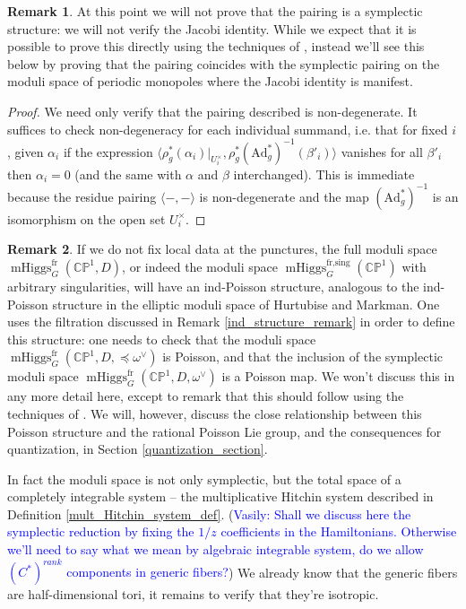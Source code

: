 \documentclass[11pt, oneside, reqno]{amsart}
\theoremstyle{definition} \newtheorem{definition}{Definition}[section]
\theoremstyle{definition} \newtheorem{remark}[definition]{Remark}
\theoremstyle{definition} \newtheorem{remarks}[definition]{Remarks}
\theoremstyle{definition} \newtheorem{question}[definition]{Question}
\theoremstyle{definition} \newtheorem*{note}{Note}
\theoremstyle{definition} \newtheorem{example}[definition]{Example}
\theoremstyle{definition} \newtheorem{examples}[definition]{Examples}
\newcommand{\bb}[1]{\mathbb{#1}}
\newcommand{\mr}[1]{\mathrm{#1}}
\DeclareMathOperator{\mhiggs}{mHiggs}
\newcommand{\fr}{\mathrm{fr}}
\newcommand{\Ad}{\mr{Ad}}
\newcommand{\vasily}[1]{(\textcolor{blue}{Vasily: #1})}
\begin{document}
\begin{remark}
At this point we will not prove that the pairing is a symplectic structure: we will not verify the Jacobi identity.  While we expect that it is possible to prove this directly using the techniques of \cite[Section 5]{HurtubiseMarkman}, instead we'll see this below by proving that the pairing coincides with the symplectic pairing on the moduli space of periodic monopoles where the Jacobi identity is manifest.
\end{remark}

\begin{proof}
We need only verify that the pairing described is non-degenerate.  It suffices to check non-degeneracy for each individual summand, i.e. that for fixed $i$, given $\alpha_i$ if the expression $\langle \rho_g^*(\alpha_i)|_{U^\times_i}, \rho_g^*(\Ad_g^*)^{-1}(\beta'_i) \rangle$ vanishes for all $\beta'_i$ then $\alpha_i=0$ (and the same with $\alpha$ and $\beta$ interchanged).  This is immediate because the residue pairing $\langle - , - \rangle$ is non-degenerate and the map $(\Ad_g^*)^{-1}$ is an isomorphism on the open set $U^\times_i$.
\end{proof}

\begin{remark}
If we do not fix local data at the punctures, the full moduli space $\mhiggs_G^\fr(\bb{CP}^1,D)$, or indeed the moduli space $\mhiggs_G^{\text{fr,sing}}(\bb{CP}^1)$ with arbitrary singularities, will have an ind-Poisson structure, analogous to the ind-Poisson structure in the elliptic moduli space of Hurtubise and Markman.  One uses the filtration discussed in Remark \ref{ind_structure_remark} in order to define this structure: one needs to check that the moduli space  $\mhiggs_G^\fr(\bb{CP}^1,D, \preceq \omega^\vee)$ is Poisson, and that the inclusion of the symplectic moduli space $\mhiggs_G^\fr(\bb{CP}^1,D, \omega^\vee)$ is a Poisson map.  We won't discuss this in any more detail here, except to remark that this should follow using the techniques of \cite[Section 7]{HurtubiseMarkman}.  We will, however, discuss the close relationship between this Poisson structure and the rational Poisson Lie group, and the consequences for quantization, in Section \ref{quantization_section}.
\end{remark}

In fact the moduli space is not only symplectic, but the total space of a completely integrable system -- the multiplicative Hitchin system described in Definition \ref{mult_Hitchin_system_def}.  
\vasily{Shall we discuss here the symplectic reduction by fixing
  the $1/z$ coefficients in the Hamiltonians. Otherwise we'll
  need to say what we mean by algebraic integrable system,
do we allow $(C^{*})^{rank}$ components in generic fibers?} 
We already know that the generic fibers are half-dimensional tori, it remains to verify that they're isotropic.
\end{document}
